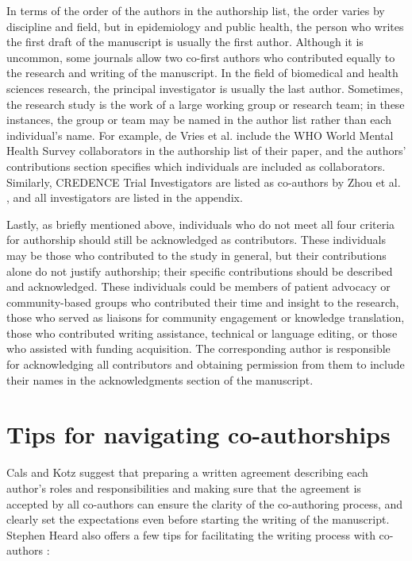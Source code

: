 \documentclass[
]{book}
\begin{document}
In terms of the order of the authors in the authorship list, the order varies by discipline and field, but in epidemiology and public health, the person who writes the first draft of the manuscript is usually the first author. Although it is uncommon, some journals allow two co-first authors who contributed equally to the research and writing of the manuscript. In the field of biomedical and health sciences research, the principal investigator is usually the last author. Sometimes, the research study is the work of a large working group or research team; in these instances, the group or team may be named in the author list rather than each individual's name. For example, de Vries et al. \citep{de2021perceived} include the WHO World Mental Health Survey collaborators in the authorship list of their paper, and the authors' contributions section specifies which individuals are included as collaborators. Similarly, CREDENCE Trial Investigators are listed as co-authors by Zhou et al. \citep{zhou2021effect}, and all investigators are listed in the appendix.

Lastly, as briefly mentioned above, individuals who do not meet all four criteria for authorship should still be acknowledged as contributors. These individuals may be those who contributed to the study in general, but their contributions alone do not justify authorship; their specific contributions should be described and acknowledged. These individuals could be members of patient advocacy or community-based groups who contributed their time and insight to the research, those who served as liaisons for community engagement or knowledge translation, those who contributed writing assistance, technical or language editing, or those who assisted with funding acquisition. The corresponding author is responsible for acknowledging all contributors and obtaining permission from them to include their names in the acknowledgments section of the manuscript.

\hypertarget{tips-for-navigating-co-authorships}{%
\section{Tips for navigating co-authorships}\label{tips-for-navigating-co-authorships}}

Cals and Kotz \citep{cals2013effective8} suggest that preparing a written agreement describing each author's roles and responsibilities and making sure that the agreement is accepted by all co-authors can ensure the clarity of the co-authoring process, and clearly set the expectations even before starting the writing of the manuscript. Stephen Heard also offers a few tips for facilitating the writing process with co-authors \citep[p.247-259]{heard2016scientist}:
\end{document}
